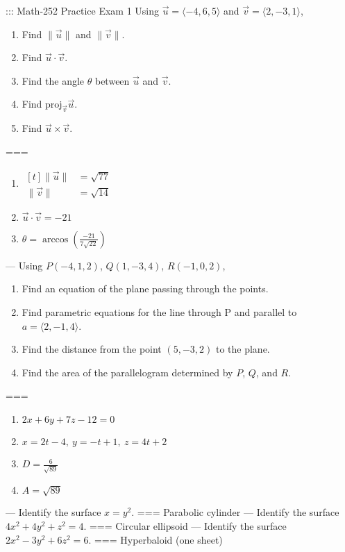 ::: Math-252 Practice Exam 1
Using \(\vec u=\langle-4,6,5\rangle\) and \(\vec v=\langle 2,-3,1\rangle\),
\begin{enumerate}[label=\alph*.]
  \item Find \(\|\vec u\|\) and \(\|\vec v\|\).
  \item Find \(\vec u\cdot\vec v\).
  \item Find the angle \(\theta\) between \(\vec u\) and \(\vec v\).
  \item Find \(\text{proj}_{\vec v}\vec u\).
  \item Find \(\vec u\times\vec v\).
\end{enumerate}
===
\begin{enumerate}[label=\alph*.]
  \item
    \(\begin{aligned}[t]
      \|\vec u\|&=\sqrt{77} \\
      \|\vec v\|&=\sqrt{14}
    \end{aligned}\)
  \item \(\vec u\cdot\vec v=-21\)
  \item \(\displaystyle \theta=\arccos\left(\frac{-21}{7\sqrt{22}}\right)\)
\end{enumerate}
---
Using \(P(-4,1,2)\), \(Q(1,-3,4)\), \(R(-1,0,2)\),
\begin{enumerate}[label=\alph*.]
  \item Find an equation of the plane passing through the points.
  \item Find parametric equations for the line through P and parallel to \(a=\langle 2,-1,4\rangle\).
  \item Find the distance from the point \((5,-3,2)\) to the plane.
  \item Find the area of the parallelogram determined by \(P\), \(Q\), and \(R\).
\end{enumerate}
===
\begin{enumerate}[label=\alph*.]
  \item \(2x+6y+7z-12=0\)
  \item \(x=2t-4,\ y=-t+1,\ z=4t+2\)
  \item \(\displaystyle D=\frac{6}{\sqrt{89}}\)
  \item \(A=\sqrt{89}\)
\end{enumerate}
---
Identify the surface \(x=y^2\).
===
Parabolic cylinder
---
Identify the surface \(4x^2+4y^2+z^2=4\).
===
Circular ellipsoid
---
Identify the surface \(2x^2-3y^2+6z^2=6\).
===
Hyperbaloid (one sheet)
